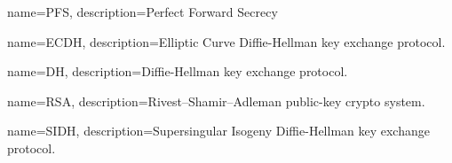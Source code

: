 
{
    name=PFS,
    description={Perfect Forward Secrecy}
}

{
    name=ECDH,
    description={Elliptic Curve Diffie-Hellman key exchange protocol.}
}

{
    name=DH,
    description={Diffie-Hellman key exchange protocol.}
}

{
    name=RSA,
    description={Rivest–Shamir–Adleman public-key crypto system.}
}

{
    name=SIDH,
    description={Supersingular Isogeny Diffie-Hellman key exchange protocol.}
}


